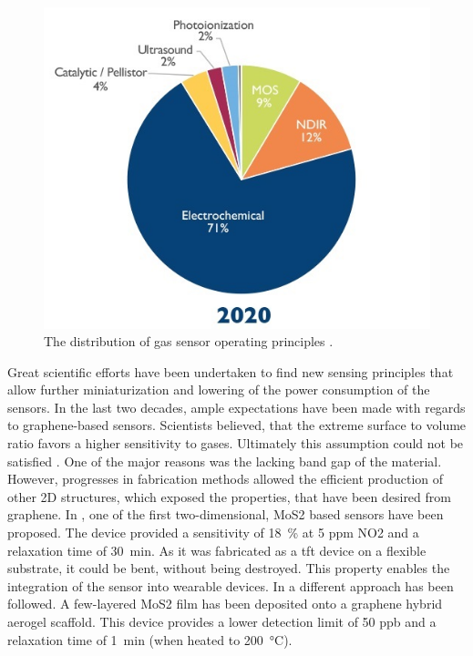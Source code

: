 \begin{figure}
\centering
    \includegraphics[width=.5\textwidth]{01_Introduction/fig/gas_sensor_distribution.jpg}
    \caption{The distribution of gas sensor operating principles \cite{yole2021}.}
    \label{fig:gas_sensor_distribution}
\end{figure}
Great scientific efforts have been undertaken to find new sensing principles that allow further miniaturization and lowering of the power consumption of the sensors. In the last two decades, ample expectations have been made with regards to graphene-based sensors. Scientists believed, that the extreme surface to volume ratio favors a higher sensitivity to gases. Ultimately this assumption could not be satisfied \cite{Geim2013}. One of the major reasons was the lacking band gap of the material. However, progresses in fabrication methods allowed the efficient production of other 2D structures, which exposed the properties, that have been desired from graphene. In \cite{He2012}, one of the first two-dimensional, MoS2 based sensors have been proposed. The device provided a sensitivity of \SI{18}{\percent} at 5 ppm NO2 and a relaxation time of \SI{30}{\minute}. As it was fabricated as a \gls{tft} device on a flexible substrate, it could be bent, without being destroyed. This property enables the integration of the sensor into wearable devices. In \cite{Long2016} a different approach has been followed. A few-layered MoS2 film has been deposited onto a graphene hybrid aerogel scaffold. This device provides a lower detection limit of 50 ppb and a relaxation time of \SI{1}{\minute} (when heated to \SI{200}{\celsius}). \\
